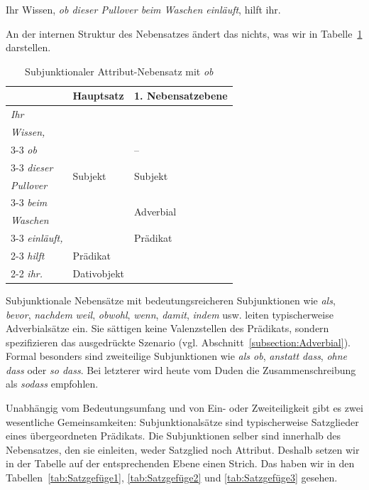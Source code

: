 \ea \label{ea:ob_Attr} Ihr Wissen, \textit{ob dieser Pullover beim Waschen einläuft}, hilft ihr.
\z 

An der internen Struktur des Nebensatzes ändert das nichts, was wir in Tabelle~\ref{tab:Satzgefüge_mit_ob_Attributsatz} darstellen.

\begin{table}
  \centering
  \begin{tabular}{l|l|l}
     &  Hauptsatz & 1. Nebensatzebene \\
    \hline
    \textit{Ihr} & \multirow{8}{*}{Subjekt} &  \\
    \textit{Wissen,} & & \\ \cline{3-3}
    \textit{ob} & &  -- \\ \cline{3-3} 
    \textit{dieser} &  & \multirow{2}{*}{Subjekt} \\ 
    \textit{Pullover} & & \\ \cline{3-3} 
    \textit{beim} & & \multirow{2}{*}{Adverbial} \\
    \textit{Waschen} & & \\ \cline{3-3}
    \textit{einläuft,} & & Prädikat  \\ \cline{2-3} 
    \textit{hilft} & Prädikat \\ \cline{2-2}
    \textit{ihr.} & Dativobjekt & \\
    \hline
  \end{tabular}
  \caption{Subjunktionaler Attribut-Nebensatz mit \textit{ob}}
  \label{tab:Satzgefüge_mit_ob_Attributsatz}
\end{table}


Subjunktionale Nebensätze mit bedeutungsreicheren Subjunktionen wie \textit{als}, \textit{bevor}, \textit{nachdem} \textit{weil}, \textit{obwohl}, \textit{wenn}, \textit{damit}, \textit{indem} usw. leiten typischerweise Adverbialsätze ein. Sie sättigen keine Valenzstellen des Prädikats, sondern spezifizieren das ausgedrückte Szenario (vgl. Abschnitt~\ref{subsection:Adverbial}). Formal besonders sind zweiteilige Subjunktionen wie \textit{als ob}, \textit{anstatt dass}, \textit{ohne dass} oder \textit{so dass}. Bei letzterer wird heute vom Duden die Zusammenschreibung als \textit{sodass} empfohlen.

Unabhängig vom Bedeutungsumfang und von Ein- oder Zweiteiligkeit gibt es zwei wesentliche Gemeinsamkeiten: Subjunktionalsätze sind typischerweise Satzglieder eines übergeordneten Prädikats. Die Subjunktionen selber sind innerhalb des Nebensatzes, den sie einleiten, weder Satzglied noch Attribut. Deshalb setzen wir in der Tabelle auf der entsprechenden Ebene einen Strich. Das haben wir in den Tabellen~\ref{tab:Satzgefüge1}, \ref{tab:Satzgefüge2} und \ref{tab:Satzgefüge3} gesehen.

